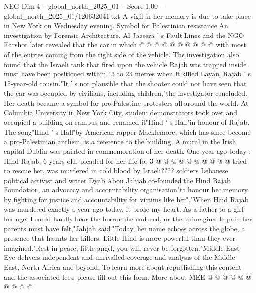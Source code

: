 \begin{textsample}{NEG Dim 4 – global\_north\_2025\_01 – Score 1.00 – global\_north\_2025\_01/120632041.txt}
A vigil in her memory is due to take place in New York on Wednesday evening.
Symbol for Palestinian resistance An investigation by Forensic Architecture, Al Jazeera ' s Fault Lines and the NGO Earshot later revealed that the car in which @ @ @ @ @ @ @ @ @ @ with most of the entries coming from the right side of the vehicle.
The investigation also found that the Israeli tank that fired upon the vehicle Rajab was trapped inside must have been positioned within 13 to 23 metres when it killed Layan, Rajab ' s 15-year-old cousin."It ' s not plausible that the shooter could not have seen that the car was occupied by civilians, including children,"the investigator concluded.
Her death became a symbol for pro-Palestine protesters all around the world.
At Columbia University in New York City, student demonstrators took over and occupied a building on campus and renamed it"Hind ' s Hall"in honour of Rajab.
The song"Hind ' s Hall"by American rapper Macklemore, which has since become a pro-Palestinian anthem, is a reference to the building.
A mural in the Irish capital Dublin was painted in commemoration of her death.
One year ago today : Hind Rajab, 6 years old, pleaded for her life for 3 @ @ @ @ @ @ @ @ @ @ tried to rescue her, was murdered in cold blood by Israeli???? soldiers Lebanese political activist and writer Dyab Abou Jahjah co-founded the Hind Rajab Foundation, an advocacy and accountability organisation"to honour her memory by fighting for justice and accountability for victims like her"."When Hind Rajab was murdered exactly a year ago today, it broke my heart.
As a father to a girl her age, I could hardly bear the horror she endured, or the unimaginable pain her parents must have felt,"Jahjah said."Today, her name echoes across the globe, a presence that haunts her killers.
Little Hind is more powerful than they ever imagined."Rest in peace, little angel, you will never be forgotten."Middle East Eye delivers independent and unrivalled coverage and analysis of the Middle East, North Africa and beyond.
To learn more about republishing this content and the associated fees, please fill out this form.
More about MEE @ @ @ @ @ @ @ @ @ @

\end{textsample}
